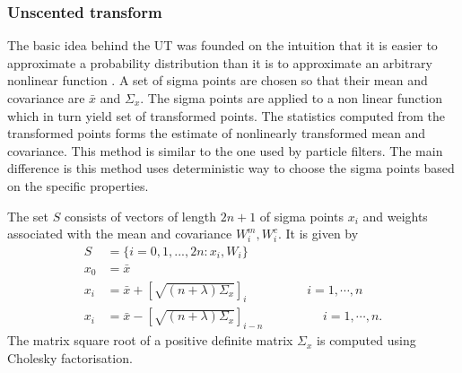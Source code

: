 \subsubsection{Unscented transform}
The basic idea behind the UT was founded on the intuition that it is easier to approximate a probability distribution than it is to approximate an arbitrary nonlinear function \citep{jul04}. A set of sigma points are chosen so that their mean and covariance are $\bar x$ and $\Sigma_x$. The sigma points are applied to a non linear function which in turn yield set of transformed points. The statistics computed from the transformed points forms the estimate of nonlinearly transformed mean and covariance. This method is similar to the one used by particle filters. The main difference is this method uses deterministic way to choose the sigma points based on the specific properties. 

The set $S$ consists of vectors of length $2n+1$ of sigma points $x_i$ and weights associated with the mean and covariance $W_i^m, W_i^c $. It is given by \citep{sim07} 
\begin{equation} 
    \label{eq:ut_sigma}
    \begin{split}
    S &= \{i= 0,1,...,2n:x_i,W_i \} \\
    x_0 &= \bar x \\ 
    x_i &= \bar x + \left[ \sqrt{(n+\lambda)\Sigma_x} \right ]_i \hspace{2cm} i = 1, \cdots ,n \\
    x_i &= \bar x - \left[ \sqrt{(n+\lambda)\Sigma_x} \right ]_{i-n} \hspace{2cm} i = 1, \cdots ,n . 
    \end{split}
\end{equation}
The matrix square root of a positive definite matrix $\Sigma_x$ is computed using Cholesky factorisation. 

